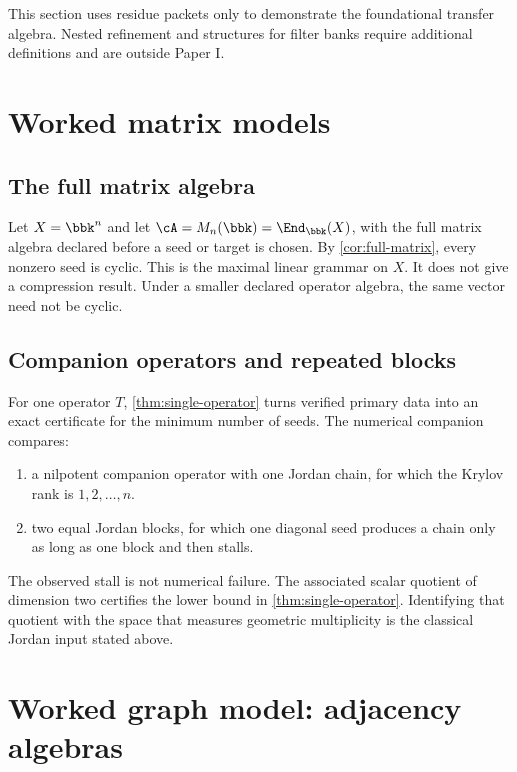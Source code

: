 \begin{boundary}
This section uses residue packets only to demonstrate the foundational transfer algebra. Nested refinement and structures for filter banks require additional definitions and are outside Paper I.
\end{boundary}

\section{Worked matrix models}

\subsection{The full matrix algebra}

Let $X=\bbk^n$ and let $\cA=M_n(\bbk)=\End_{\bbk}(X)$, with the full matrix algebra declared before a seed or target is chosen. By \cref{cor:full-matrix}, every nonzero seed is cyclic. This is the maximal linear grammar on $X$. It does not give a compression result. Under a smaller declared operator algebra, the same vector need not be cyclic.

\subsection{Companion operators and repeated blocks}

For one operator $T$, \cref{thm:single-operator} turns verified primary data
into an exact certificate for the minimum number of seeds.  The numerical companion compares:
\begin{enumerate}[label=(\alph*)]
\item a nilpotent companion operator with one Jordan chain, for which the Krylov rank is $1,2,\ldots,n$.
\item two equal Jordan blocks, for which one diagonal seed produces a chain only as long as one block and then stalls.
\end{enumerate}

The observed stall is not numerical failure.  The associated
scalar quotient of dimension two certifies the lower bound in
\cref{thm:single-operator}. Identifying that quotient with the space that
measures geometric multiplicity is the classical Jordan input stated above.

\section{Worked graph model: adjacency algebras}

